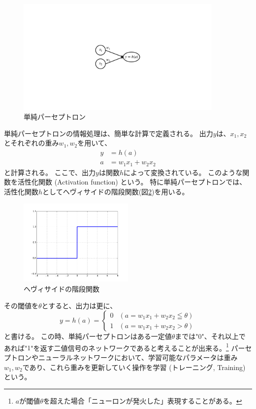 \begin{figure}[h]
 \centering
 \includegraphics[trim = 250 300 250 300, width=0.9\textwidth, clip]{Figure/2DeepLearning/2SimplePerceptron.png}
 \caption{単純パーセプトロン}
 \label{2SimplePerceptron}
\end{figure}

単純パーセプトロンの情報処理は、簡単な計算で定義される。
出力$y$は、$x_1,x_2$とそれぞれの重み$w_1,w_2$を用いて、
\begin{equation}
 \begin{split}
  y &= h(a)\\
  a &= w_1x_1 + w_2x_2
 \end{split}
\end{equation}
と計算される。
ここで、出力$y$は関数$h$によって変換されている。
このような関数を活性化関数 (Activation function) という。
特に単純パーセプトロンでは、活性化関数$h$としてヘヴィサイドの階段関数(図\ref{3HeavisideStepFunction})を用いる。

\begin{figure}[h]
 \centering
 \includegraphics[width=0.5\textwidth]{Figure/2DeepLearning/3HeavisideStepFunction.png}
 \caption{ヘヴィサイドの階段関数}
 \label{3HeavisideStepFunction}
\end{figure}

その閾値を$\theta$とすると、出力は更に、
\begin{equation}
 y = h(a) = \left\{ \begin{array}{ll}
    0 & (a = w_1x_1 + w_2x_2 \leqq \theta) \\
    1 & (a = w_1x_1 + w_2x_2 > \theta)
 \end{array} \right.
\end{equation}
と書ける。
この時、単純パーセプトロンはある一定値$\theta$までは"$0$"、それ以上であれば"$1$"を返す二値信号のネットワークであると考えることが出来る。\footnote{$a$が閾値$\theta$を超えた場合「ニューロンが発火した」表現することがある。}
パーセプトロンやニューラルネットワークにおいて、学習可能なパラメータは重み$w_1,w_2$であり、これら重みを更新していく操作を学習 (トレーニング, Training) という。


